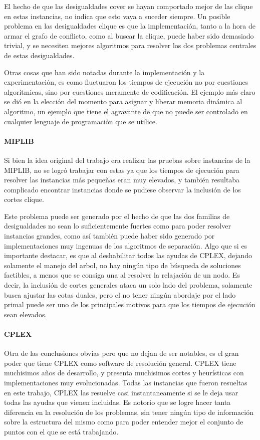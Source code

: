 El hecho de que las desigualdades cover se hayan comportado mejor de las clique en estas instancias, no indica que esto vaya a suceder siempre. Un posible problema en las desigualdades clique es que la implementaci\'on, tanto a la hora de armar el grafo de conflicto, como al buscar la clique, puede haber sido demasiado trivial, y se necesiten mejores algoritmos para resolver los dos problemas centrales de estas desigualdades.

Otras cosas que han sido notadas durante la implementaci\'on y la experimentaci\'on, es como fluctuaron los tiempos de ejecuci\'on no por cuestiones algor\'itmicas, sino por cuestiones meramente de codificaci\'on. El ejemplo m\'as claro se di\'o en la elecci\'on del momento para asignar y liberar memoria din\'amica al algoritmo, un ejemplo que tiene el agravante de que no puede ser controlado en cualquier lenguaje de programaci\'on que se utilice.

\medskip
\paragraph{MIPLIB}
Si bien la idea original del trabajo era realizar las pruebas sobre instancias de la MIPLIB, no se logr\'o trabajar con estas ya que los tiempos de ejecuci\'on para resolver las instancias m\'as peque\~nas eran muy elevados, y tambi\'en resultaba complicado encontrar instancias donde se pudiese observar la inclusi\'on de los cortes clique.

Este problema puede ser generado por el hecho de que las dos familias de desigualdades no sean lo suficientemente fuertes como para poder resolver instancias grandes, como as\'i tambi\'en puede haber sido generado por implementaciones muy ingenuas de los algoritmos de separaci\'on. Algo que si es importante destacar, es que al deshabilitar todos las ayudas de CPLEX, dejando solamente el manejo del arbol, no hay ning\'un tipo de b\'usqueda de soluciones factibles, a menos que se consiga una al resolver la relajaci\'on de un nodo. Es decir, la inclusi\'on de cortes generales ataca un solo lado del problema, solamente busca ajustar las cotas duales, pero el no tener ning\'un abordaje por el lado primal puede ser uno de los principales motivos para que los tiempos de ejecuci\'on sean elevados.


\paragraph{CPLEX}


Otra de las conclusiones obvias pero que no dejan de ser notables, es el gran poder que tiene CPLEX como software de resoluci\'on general. CPLEX tiene muchisimos a\~nos de desarrollo, y presenta muchisimos cortes y heur\'isticas con implementaciones muy evolucionadas. Todas las instancias que fueron resueltas en este trabajo, CPLEX las resuelve casi instantaneamente si se le deja usar todas las ayudas que vienen incluidas. Es notorio que se logre hacer tanta diferencia en la resoluci\'on de los problemas, sin tener ning\'un tipo de informaci\'on sobre la estructura del mismo como para poder entender mejor el conjunto de puntos con el que se est\'a trabajando.

